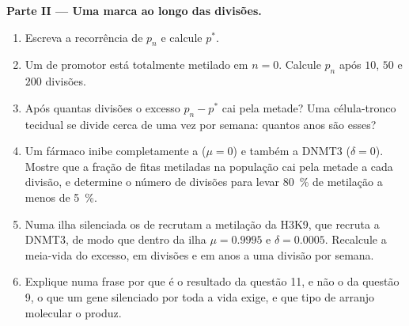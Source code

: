 \begin{problem}
\medskip
\noindent\textbf{Parte II --- Uma marca ao longo das divisões.}
\begin{enumerate}[resume]
  \item Escreva a recorrência de $p_{n}$ e calcule $p^{*}$.
  \item Um  de promotor está totalmente metilado em $n = 0$.
        Calcule $p_{n}$ após $10$, $50$ e $200$ divisões.
  \item Após quantas divisões o excesso $p_{n} - p^{*}$ cai pela
        metade? Uma célula-tronco tecidual se divide cerca de uma vez
        por semana: quantos anos são esses?
  \item Um fármaco inibe completamente a  ($\mu = 0$) e também a
        DNMT3 ($\delta = 0$). Mostre que a fração de fitas metiladas
        na população cai pela metade a cada divisão, e determine o
        número de divisões para levar \qty{80}{\%} de metilação a
        menos de \qty{5}{\%}.
  \item Numa ilha silenciada os  de  recrutam a
        metilação da H3K9, que recruta a DNMT3, de modo que dentro da
        ilha $\mu = 0.9995$ e $\delta = 0.0005$. Recalcule a
        meia-vida do excesso, em divisões e em anos a uma divisão por
        semana.
  \item Explique numa frase por que é o resultado da questão 11, e não
        o da questão 9, o que um gene silenciado por toda a vida
        exige, e que tipo de arranjo molecular o produz.
\end{enumerate}


\end{problem}
